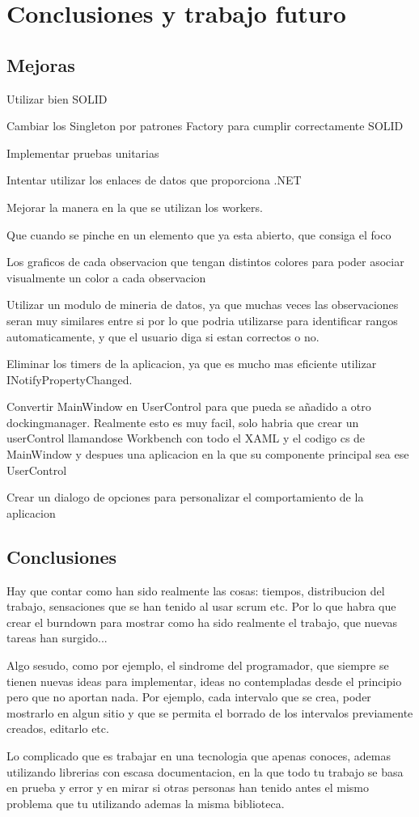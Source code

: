 \chapter{Conclusiones y trabajo futuro}

\section{Mejoras}
Utilizar bien SOLID

Cambiar los Singleton por patrones Factory para cumplir correctamente SOLID

Implementar pruebas unitarias

Intentar utilizar los enlaces de datos que proporciona .NET

Mejorar la manera en la que se utilizan los workers.

Que cuando se pinche en un elemento que ya esta abierto, que consiga el foco

Los graficos de cada observacion que tengan distintos colores para poder asociar
visualmente un color a cada observacion

Utilizar un modulo de mineria de datos, ya que muchas veces las observaciones
seran muy similares entre si por lo que podria utilizarse para identificar 
rangos automaticamente, y que el usuario diga si estan correctos o no.

Eliminar los timers de la aplicacion, ya que es mucho mas eficiente utilizar
INotifyPropertyChanged.

Convertir MainWindow en UserControl para que pueda se añadido a otro dockingmanager.
Realmente esto es muy facil, solo habria que crear un userControl llamandose Workbench
con todo el XAML y el codigo cs de MainWindow y despues una aplicacion en la que su
componente principal sea ese UserControl

Crear un dialogo de opciones para personalizar el comportamiento de la aplicacion

\section{Conclusiones}
Hay que contar como han sido realmente las cosas: tiempos, distribucion del trabajo, 
sensaciones que se han tenido al usar scrum etc. Por lo que habra que crear el
burndown para mostrar como ha sido realmente el trabajo, que nuevas tareas han surgido...

Algo sesudo, como por ejemplo, el sindrome del programador, que siempre se tienen nuevas
ideas para implementar, ideas no contempladas desde el principio pero que no aportan nada.
Por ejemplo, cada intervalo que se crea, poder mostrarlo en algun sitio y que se permita
el borrado de los intervalos previamente creados, editarlo etc.

Lo complicado que es trabajar en una tecnologia que apenas conoces, ademas utilizando
librerias con escasa documentacion, en la que todo tu trabajo se basa en prueba y error
y en mirar si otras personas han tenido antes el mismo problema que tu utilizando
ademas la misma biblioteca.
